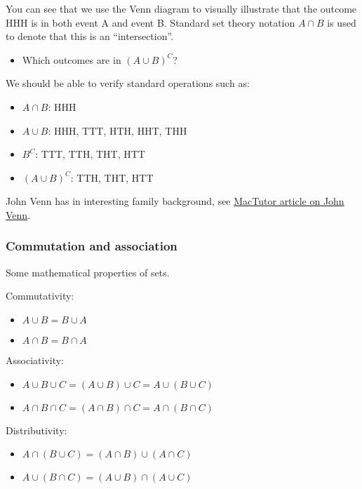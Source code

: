 \documentclass{book}
\begin{document}
You can see that we use the Venn diagram to visually illustrate that the outcome HHH is in both event A and event B.   Standard set theory notation $A \cap B$ is used to denote that this is an ``intersection''.

\begin{itemize}
\item Which outcomes are in $(A \cup B)^C$?
\end{itemize}





We should be able to verify standard operations such as:
\begin{itemize}
\item $A \cap B$: HHH
\item $A \cup B$: HHH, TTT, HTH, HHT, THH
\item $B^C$: TTT, TTH, THT, HTT
\item $(A \cup B)^C$: TTH, THT, HTT
\end{itemize}



John Venn has in interesting family background, see \href{http://www-groups.dcs.st-and.ac.uk/history/Biographies/Venn.html}{\color{blue}MacTutor article on John Venn}.


\subsubsection{Commutation and association}

Some mathematical properties of sets.


Commutativity:
\begin{itemize}
\item $A \cup B = B \cup A$
\item $A \cap B  = B \cap A$
\end{itemize}


Associativity:
\begin{itemize}
\item $A \cup B \cup C = (A \cup B) \cup C = A \cup (B \cup C)$
\item $A \cap B \cap C = (A \cap B) \cap C = A \cap (B \cap C)$
\end{itemize}

Distributivity:
\begin{itemize}
\item $A \cap (B \cup C) = (A \cap B) \cup (A \cap C)$
\item $A \cup (B \cap C) = (A \cup B) \cap (A \cup C)$
\end{itemize}
\end{document}
